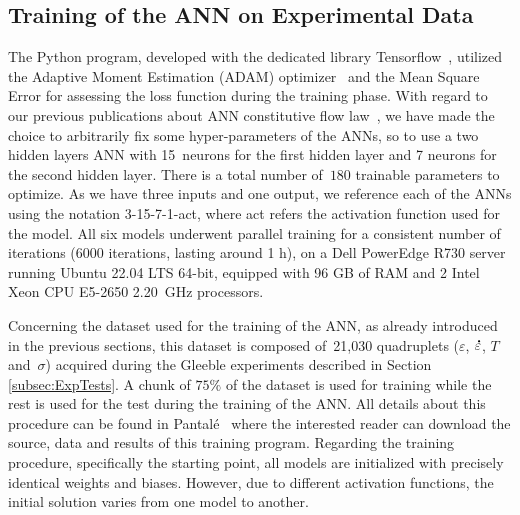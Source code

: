 \documentclass[algorithms,article,accept,pdftex,oneauthor]{Definitions/mdpi}
\DeclareRobustCommand{\mdot}[1]{\accentset{\mbox{\bfseries .}}{#1}}
\begin{document}
\subsection{Training of the ANN on Experimental Data}\label{subsec:train}

The Python program, developed with the dedicated library Tensorflow~\cite{Tensorflow-2015}, utilized the Adaptive Moment Estimation (ADAM) optimizer~\cite{Kingma-2015-AMS} and the Mean Square Error for assessing the loss function during the training phase.
With regard to our previous publications about ANN constitutive flow law~\cite{Pantale-2021-EIN}, we have made the choice to arbitrarily fix some hyper-parameters of the ANNs, so to use a two hidden layers ANN with 15~neurons for the first hidden layer and 7 neurons for the second hidden layer.
There is a total number of~$180$ trainable parameters to optimize.
As we have three inputs and one output, we reference each of the ANNs using the notation 3-15-7-1-act, where act refers the activation function used for the model.
All six models underwent parallel training for a consistent number of iterations ($6000$ iterations, lasting around 1 h), on a Dell PowerEdge R730 %
 server running Ubuntu 22.04 LTS 64-bit, equipped with 96 GB of RAM and 2 Intel Xeon CPU E5-2650 2.20~GHz processors.

Concerning the dataset used for the training of the ANN, as already introduced in the previous sections, this dataset is composed of~21,030 quadruplets ($\varepsilon$, $\mdot{\varepsilon}$, $T$ and~$\sigma$) acquired during the Gleeble experiments described in Section \ref{subsec:ExpTests}.
A chunk of $75\%$ of the dataset is used for training while the rest is used for the test during the training of the ANN.
All details about this procedure can be found in Pantalé~\cite{Pantale-2023-SSF} where the interested reader can download the source, data and results of this training program.
Regarding the training procedure, specifically the starting point, all models are initialized with precisely identical weights and biases.
However, due to different activation functions, the initial solution varies from one model to another.
\end{document}
